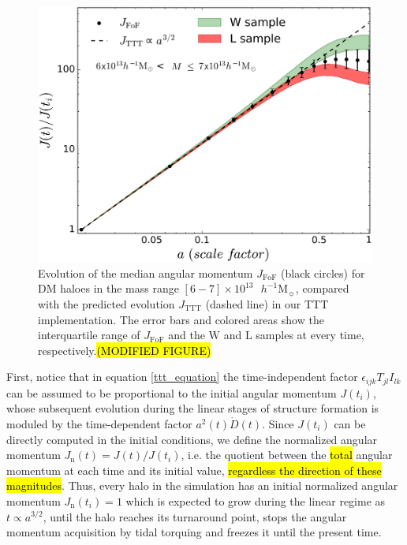 \documentclass[fleqn,usenatbib]{mnras}
\newcommand{\hMsun}{{\textrm{ $h^{-1}$M$_{\sun}$}}}
\newcommand{\Wh}{\mathrm{W}}
\newcommand{\Lh}{\mathrm{L}}
\begin{document}
\begin{figure}
	\includegraphics[width=\columnwidth]{400Mpc_figs/J_median_6-7e13.pdf}
    \caption{Evolution of the median angular momentum $J_\mathrm{FoF}$ (black circles) for DM haloes in the mass range $[6-7]\times 10^{13}\hMsun$, compared with the predicted evolution $J_\mathrm{TTT}$ (dashed line) in our TTT implementation. The error bars and colored areas show the interquartile range of $J_\mathrm{FoF}$ and the $\Wh$ and $\Lh$ samples at every time, respectively.\hl{(MODIFIED FIGURE)}}
    \label{fig:J_median}
\end{figure}

First, notice that in equation \eqref{ttt_equation} the time-independent factor $\epsilon_{ijk}T_{jl}I_{lk}$ can be assumed to be proportional to the initial angular momentum $J(t_i)$, whose subsequent evolution during the linear stages of structure formation is moduled by the time-dependent factor $a^2(t)\dot{D}(t)$. Since $J(t_i)$ can be directly computed in the initial conditions, we define the {normalized angular momentum} $J_\mathrm{n}(t)=J(t)/J(t_i)$, i.e. the quotient between the \hl{total} angular momentum at each time and its initial value, \hl{regardless the direction of these magnitudes}. Thus, every halo in the simulation has an initial normalized angular momentum $J_\mathrm{n}(t_i)=1$ which is expected to grow during the linear regime as $t\propto a^{3/2}$, until the halo reaches its turnaround point, stops the angular momentum acquisition by tidal torquing and freezes it until the present time.
\end{document}
